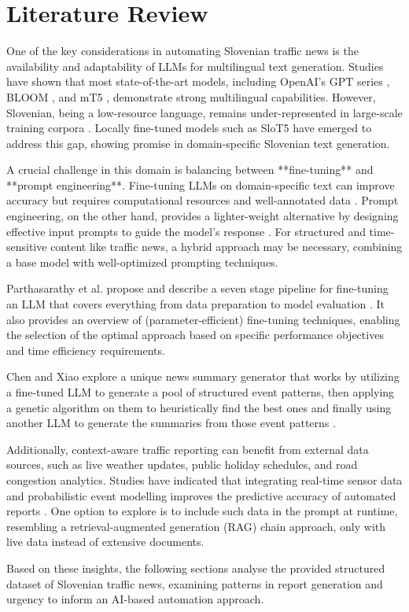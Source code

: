 \section*{Literature Review} 
One of the key considerations in automating Slovenian traffic news is the availability and adaptability of LLMs for multilingual text generation. Studies have shown that most state-of-the-art models, including OpenAI’s GPT series \cite{brown2020language}, BLOOM \cite{scao2022bloom}, and mT5 \cite{xue2021mt5}, demonstrate strong multilingual capabilities. However, Slovenian, being a low-resource language, remains under-represented in large-scale training corpora \cite{ulcar2021sloberta}. Locally fine-tuned models such as SloT5 \cite{ulcar2022slot5} have emerged to address this gap, showing promise in domain-specific Slovenian text generation.

A crucial challenge in this domain is balancing between **fine-tuning** and **prompt engineering**. Fine-tuning LLMs on domain-specific text can improve accuracy but requires computational resources and well-annotated data \cite{zhang2022fine}. Prompt engineering, on the other hand, provides a lighter-weight alternative by designing effective input prompts to guide the model’s response \cite{reynolds2021prompt}. For structured and time-sensitive content like traffic news, a hybrid approach may be necessary, combining a base model with well-optimized prompting techniques.

Parthasarathy et al. propose and describe a seven stage pipeline for fine-tuning an LLM that covers everything from data preparation to model evaluation \cite{ultimate2024}.
It also provides an overview of (parameter-efficient) fine-tuning techniques, enabling the selection of the optimal approach based on specific performance objectives and time efficiency requirements.

Chen and Xiao explore a unique news summary generator that works by utilizing a fine-tuned LLM to generate a pool of structured event patterns, then applying a genetic algorithm on them to heuristically find the best ones and finally using another LLM to generate the summaries from those event patterns \cite{xiao2023enhancing}.

Additionally, context-aware traffic reporting can benefit from external data sources, such as live weather updates, public holiday schedules, and road congestion analytics.
Studies have indicated that integrating real-time sensor data and probabilistic event modelling improves the predictive accuracy of automated reports \cite{schelter2019automated}.
One option to explore is to include such data in the prompt at runtime, resembling a retrieval-augmented generation (RAG) chain approach, only with live data instead of extensive documents.

Based on these insights, the following sections analyse the provided structured dataset of Slovenian traffic news, examining patterns in report generation and urgency to inform an AI-based automation approach.
